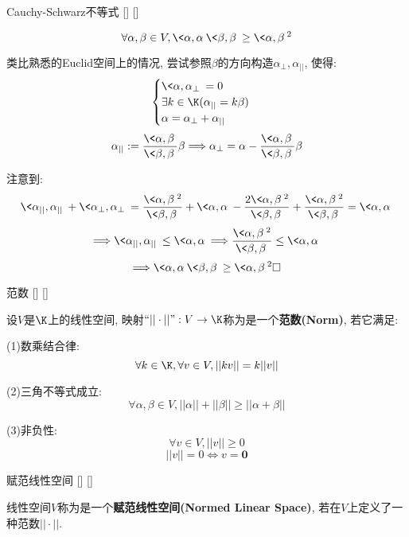 \documentclass[UTF8]{ctexart}
\begin{document}
		\begin{thm}
			[]
			{Cauchy-Schwarz不等式}
			[]
			[]

			\[\forall\alpha, \beta\in V, \<\alpha,\alpha\>\<\beta,\beta\>\geq\<\alpha,\beta\>^2\]
		\end{thm}

		\begin{prf}
			类比熟悉的Euclid空间上的情况, 尝试参照$\beta$的方向构造$\alpha_\perp,\alpha_{||}$, 使得: 
			\[\begin{cases}
				\<\alpha,\alpha_\perp\>=0\\
				\exists k\in\K(\alpha_{||}=k\beta)\\
				\alpha=\alpha_\perp+\alpha_{||}
			\end{cases}\]
			\[\alpha_{||}:=\frac{\<\alpha,\beta\>}{\<\beta,\beta\>}\beta\Longrightarrow\alpha_\perp=\alpha-\frac{\<\alpha,\beta\>}{\<\beta,\beta\>}\beta\]

			注意到: 
			\[\<\alpha_{||},\alpha_{||}\>+\<\alpha_\perp,\alpha_\perp\>=\frac{\<\alpha,\beta\>^2}{\<\beta,\beta\>}+\<\alpha,\alpha\>-\frac{2\<\alpha,\beta\>^2}{\<\beta,\beta\>}+\frac{\<\alpha,\beta\>^2}{\<\beta,\beta\>}=\<\alpha,\alpha\>\]
			\[\Longrightarrow\<\alpha_{||},\alpha_{||}\>\leq\<\alpha,\alpha\>\Longrightarrow\frac{\<\alpha,\beta\>^2}{\<\beta,\beta\>}\leq\<\alpha,\alpha\>\]
			\[\Longrightarrow\<\alpha,\alpha\>\<\beta,\beta\>\geq\<\alpha,\beta\>^2\square\]
		\end{prf} 

		\begin{dfn}
			[]
			{范数}
			[]
			[]

			设$V$是$\K$上的线性空间, 映射$``||\cdot||":V\to\K$称为是一个\textbf{范数(Norm)}, 若它满足: 
			
			(1)数乘结合律: 
			\[\forall k\in\K, \forall v\in V, ||kv||=k||v||\]
			
			(2)三角不等式成立: 
			\[\forall \alpha,\beta\in V, ||\alpha||+||\beta||\geq||\alpha+\beta||\]
			
			(3)非负性: 
			\[\forall v\in V, ||v||\geq 0\]
			\[||v||=0\Longleftrightarrow v=\mathbf{0}\]
		\end{dfn}
		
		\begin{dfn}
			[]
			{赋范线性空间}
			[]
			[]

			线性空间$V$称为是一个\textbf{赋范线性空间(Normed Linear Space)}, 若在$V$上定义了一种范数$||\cdot||$. 
		\end{dfn}
		
\end{document}
